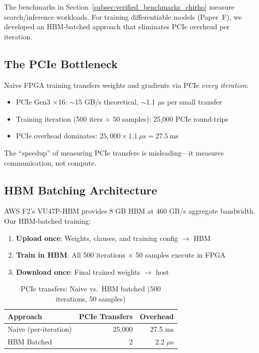 \documentclass[11pt,a4paper]{article}
\begin{document}
The benchmarks in Section~\ref{subsec:verified_benchmarks_chirho} measure
search/inference workloads. For training differentiable models (Paper~F),
we developed an HBM-batched approach that eliminates PCIe overhead per iteration.

\subsection{The PCIe Bottleneck}
\label{subsec:pcie_bottleneck_chirho}

Naive FPGA training transfers weights and gradients via PCIe \emph{every iteration}:
\begin{itemize}
  \item PCIe Gen3 $\times$16: $\sim$15 GB/s theoretical, $\sim$1.1 $\mu$s per small transfer
  \item Training iteration (500 iters $\times$ 50 samples): 25,000 PCIe round-trips
  \item PCIe overhead dominates: $25{,}000 \times 1.1~\mu\text{s} = 27.5~\text{ms}$
\end{itemize}

The ``speedup'' of measuring PCIe transfers is misleading---it measures communication, not compute.

\subsection{HBM Batching Architecture}
\label{subsec:hbm_batch_chirho}

AWS F2's VU47P-HBM provides 8 GB HBM at 460 GB/s aggregate bandwidth.
Our HBM-batched training:

\begin{enumerate}
  \item \textbf{Upload once}: Weights, clauses, and training config $\to$ HBM
  \item \textbf{Train in HBM}: All 500 iterations $\times$ 50 samples execute in FPGA
  \item \textbf{Download once}: Final trained weights $\to$ host
\end{enumerate}

\begin{table}[ht]
\centering
\caption{PCIe transfers: Naive vs.\ HBM batched (500 iterations, 50 samples)}
\label{tab:pcie_comparison_chirho}
\begin{tabular}{lrr}
\toprule
\textbf{Approach} & \textbf{PCIe Transfers} & \textbf{Overhead} \\
\midrule
Naive (per-iteration) & 25,000 & 27.5 ms \\
HBM Batched & 2 & 2.2 $\mu$s \\
\bottomrule
\end{tabular}
\end{table}
\end{document}
